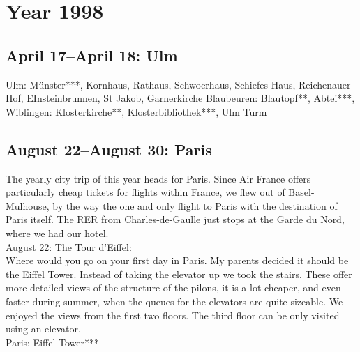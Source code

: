 \chapter{Year 1998}
\label{1998}

\section{April 17--April 18: Ulm}
\label{1998:Ulm}


Ulm: M\"unster***, Kornhaus, Rathaus, Schwoerhaus, Schiefes Haus, Reichenauer Hof, EInsteinbrunnen, St Jakob, Garnerkirche
Blaubeuren: Blautopf**, Abtei***, Wiblingen: Klosterkirche**, Klosterbibliothek***, Ulm Turm

\section{August 22--August 30: Paris}
\label{1998:Paris}

The yearly city trip of this year heads for Paris. Since Air France offers particularly cheap tickets for flights within France, we flew out of Basel-Mulhouse, by the way the one and only flight to Paris with the destination of Paris itself. The RER from Charles-de-Gaulle just stops at the Garde du Nord, where we had our hotel.\\

August 22: The Tour d'Eiffel:\\
Where would you go on your first day in Paris. My parents decided it should be the Eiffel Tower. Instead of taking the elevator up we took the stairs. These offer more detailed views of the structure of the pilons, it is a lot cheaper, and even faster during summer, when the queues for the elevators are quite sizeable. We enjoyed the views from the first two floors. The third floor can be only visited using an elevator.\\

Paris: Eiffel Tower***\\

